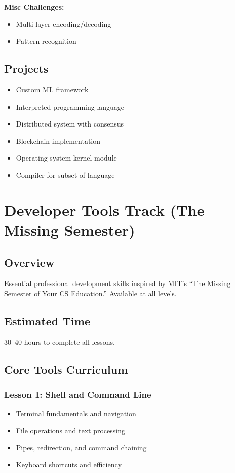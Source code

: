 \documentclass[11pt,letterpaper]{article}
\begin{document}
\textbf{Misc Challenges:}
\begin{itemize}[leftmargin=*]
    \item Multi-layer encoding/decoding
    \item Pattern recognition
\end{itemize}

\subsection{Projects}
\begin{itemize}[leftmargin=*]
    \item Custom ML framework
    \item Interpreted programming language
    \item Distributed system with consensus
    \item Blockchain implementation
    \item Operating system kernel module
    \item Compiler for subset of language
\end{itemize}

\section{Developer Tools Track (The Missing Semester)}

\subsection{Overview}
Essential professional development skills inspired by MIT's ``The Missing Semester of Your CS Education.'' Available at all levels.

\subsection{Estimated Time}
30--40 hours to complete all lessons.

\subsection{Core Tools Curriculum}

\subsubsection{Lesson 1: Shell and Command Line}
\begin{itemize}[leftmargin=*]
    \item Terminal fundamentals and navigation
    \item File operations and text processing
    \item Pipes, redirection, and command chaining
    \item Keyboard shortcuts and efficiency
\end{itemize}
\end{document}
